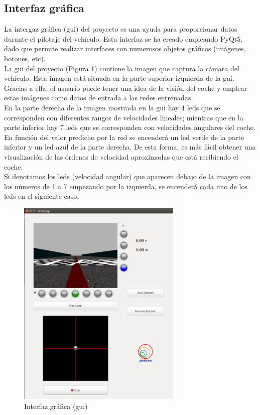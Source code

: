 \subsection{Interfaz gráfica}

La intergaz gráfica (\acrshort{gui}) del proyecto es una ayuda para proporcionar datos durante el pilotaje del vehículo. Esta interfaz se ha creado empleando PyQt5, dado que permite realizar interfaces con numerosos objetos gráficos (imágenes, botones, etc).\\

La \acrshort{gui} del proyecto (Figura \ref{fig.gui}) contiene la imagen que captura la cámara del vehículo. Esta imagen está situada en la parte superior izquierda de la \acrshort{gui}. Gracias a ella, el usuario puede tener una idea de la visión del coche y emplear estas imágenes como datos de entrada a las redes entrenadas.\\

En la parte derecha de la imagen mostrada en la \acrshort{gui} hay 4 leds que se corresponden con diferentes rangos de velocidades lineales; mientras que en la parte inferior hay 7 leds que se corresponden con velocidades angulares del coche. En función del valor predicho por la red se encenderá un led verde de la parte inferior y un led azul de la parte derecha. De esta forma, es más fácil obtener una visualización de las órdenes de velocidad aproximadas que está recibiendo el coche. \\

Si denotamos los leds (velocidad angular) que aparecen debajo de la imagen con los números de 1 a 7 empezando por la izquierda, se encenderá cada uno de los leds en el siguiente caso:

\begin{figure}[H]
  \begin{center}
    \includegraphics[width=0.7\textwidth]{figures/Infraestructura/gui.png}
		\caption{Interfaz gráfica (\acrshort{gui})}
		\label{fig.gui}
		\end{center}
\end{figure}



